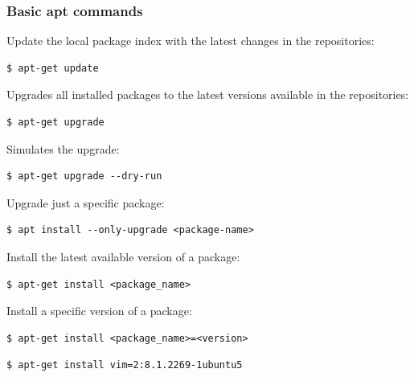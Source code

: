 \documentclass{article}
\newenvironment{codetemplate}[1][]{%
  \mybasecolorbox[#1]
  \itshape
}{%
  \endmybasecolorbox
}
\begin{document}
\subsubsection{Basic apt commands}

Update the local package index with the latest changes in the repositories:
\begin{codetemplate}
\begin{verbatim}
$ apt-get update
\end{verbatim}
\end{codetemplate}

Upgrades all installed packages to the latest versions available in the repositories:
\begin{codetemplate}
\begin{verbatim}
$ apt-get upgrade
\end{verbatim}
\end{codetemplate}

Simulates the upgrade:
\begin{codetemplate}
\begin{verbatim}
$ apt-get upgrade --dry-run
\end{verbatim}
\end{codetemplate}

Upgrade just a specific package:
\begin{codetemplate}
\begin{verbatim}
$ apt install --only-upgrade <package-name>
\end{verbatim}
\end{codetemplate}

Install the latest available version of a package:
\begin{codetemplate}
\begin{verbatim}
$ apt-get install <package_name>
\end{verbatim}
\end{codetemplate}

Install a specific version of a package:
\begin{codetemplate}
\begin{verbatim}
$ apt-get install <package_name>=<version>
\end{verbatim}
\end{codetemplate}
\begin{codetemplate}
\begin{verbatim}
$ apt-get install vim=2:8.1.2269-1ubuntu5
\end{verbatim}
\end{codetemplate}
\end{document}
